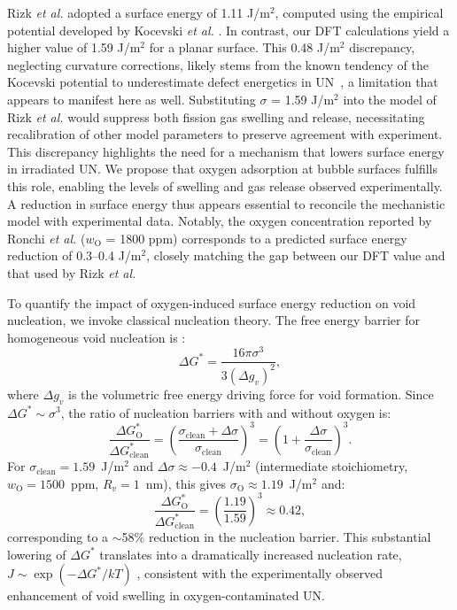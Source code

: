 \documentclass[preprint,12pt,sort&compress]{elsarticle}
\newcommand{\?}{\stackrel{?}{=}}
\begin{document}
Rizk \textit{et al.} adopted a surface energy of 1.11 J/m$^2$, computed using the empirical potential developed by Kocevski \textit{et al.} \cite{Kocevski2022II}. In contrast, our DFT calculations yield a higher value of 1.59 J/m$^2$ for a planar surface. This 0.48 J/m$^2$ discrepancy, neglecting curvature corrections, likely stems from the known tendency of the Kocevski potential to underestimate defect energetics in UN~\cite{AbdulHameed2024}, a limitation that appears to manifest here as well. Substituting $\sigma$ = 1.59 J/m$^2$ into the model of Rizk \textit{et al.} would suppress both fission gas swelling and release, necessitating recalibration of other model parameters to preserve agreement with experiment. This discrepancy highlights the need for a mechanism that lowers surface energy in irradiated UN. We propose that oxygen adsorption at bubble surfaces fulfills this role, enabling the levels of swelling and gas release observed experimentally. A reduction in surface energy thus appears essential to reconcile the mechanistic model with experimental data. Notably, the oxygen concentration reported by Ronchi \textit{et al.} ($w_\text{O}$ = 1800 ppm) corresponds to a predicted surface energy reduction of 0.3--0.4 J/m$^2$, closely matching the gap between our DFT value and that used by Rizk \textit{et al.}

To quantify the impact of oxygen-induced surface energy reduction on void nucleation, we invoke classical nucleation theory. The free energy barrier for homogeneous void nucleation is \cite{Fultz2020}:
\begin{equation}
\Delta G^* = \frac{16 \pi \sigma^3}{3 (\Delta g_v)^2},
\end{equation}
where $\Delta g_v$ is the volumetric free energy driving force for void formation. Since $\Delta G^* \sim \sigma^3$, the ratio of nucleation barriers with and without oxygen is:
\begin{equation}
\frac{\Delta G^*_\text{O}}{\Delta G^*_\text{clean}} = \left( \frac{\sigma_\text{clean} + \Delta \sigma}{\sigma_\text{clean}} \right)^3 = \left( 1 + \frac{\Delta \sigma}{\sigma_\text{clean}} \right)^3.
\end{equation}
For $\sigma_\text{clean} = 1.59$~J/m$^2$ and $\Delta \sigma \approx -0.4$~J/m$^2$ (intermediate stoichiometry, $w_\text{O} = 1500$~ppm, $R_v = 1$~nm), this gives $\sigma_\text{O} \approx 1.19$~J/m$^2$ and:
\begin{equation}
\frac{\Delta G^*_\text{O}}{\Delta G^*_\text{clean}} = \left( \frac{1.19}{1.59} \right)^3 \approx 0.42,
\end{equation}
corresponding to a $\sim$58\% reduction in the nucleation barrier. This substantial lowering of $\Delta G^*$ translates into a dramatically increased nucleation rate, $J \sim \exp(-\Delta G^*/kT)$ \cite{Fultz2020}, consistent with the experimentally observed enhancement of void swelling in oxygen-contaminated UN.
\end{document}
